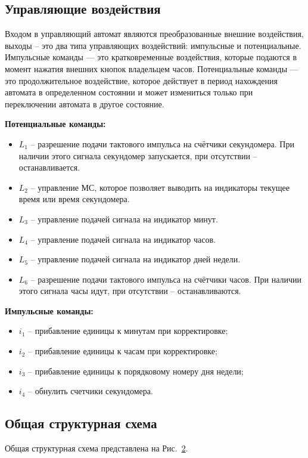 \documentclass[a4paper, final]{article}
\begin{document}
\subsection{Управляющие воздействия}
Входом в управляющий автомат являются преобразованные внешние воздействия, выходы -- это два типа управляющих воздействий: импульсные и потенциальные. 
Импульсные команды --- это кратковременные воздействия, которые подаются в момент нажатия внешних кнопок владельцем часов. Потенциальные команды --- это продолжительное воздействие, которое действует в период нахождения автомата в определенном состоянии и может измениться только при переключении автомата в другое состояние.

\noindent \textbf{Потенциальные команды:}
\begin{itemize}
  \item $L_1$ -- разрешение подачи тактового импульса на счётчики секундомера. При наличии этого сигнала секундомер запускается, при отсутствии -- останавливается.
  \item $L_2$ -- управление МС, которое позволяет выводить на индикаторы текущее время или время секундомера.
  \item $L_3$ -- управление подачей сигнала на индикатор минут.
  \item $L_4$ -- управление подачей сигнала на индикатор часов.
  \item $L_5$ -- управление подачей сигнала на индикатор дней недели.
  \item $L_6$ -- разрешение подачи тактового импульса на счётчики часов. При наличии этого сигнала часы идут, при отсутствии -- останавливаются.
\end{itemize}

\noindent \textbf{Импульсные команды:}
\begin{itemize}
  \item $i_1$ -- прибавление единицы к минутам при корректировке;
  \item $i_2$ -- прибавление единицы к часам при корректировке;
  \item $i_3$ -- прибавление единицы к порядковому номеру дня недели;
  \item $i_4$ -- обнулить счетчики секундомера.
\end{itemize}

\subsection{Общая структурная схема}
Общая структурная схема представлена на Рис.~\hyperlink{img:scheme}{2}.
\newpage
\hypertarget{img:scheme}{}

\newpage
\end{document}
